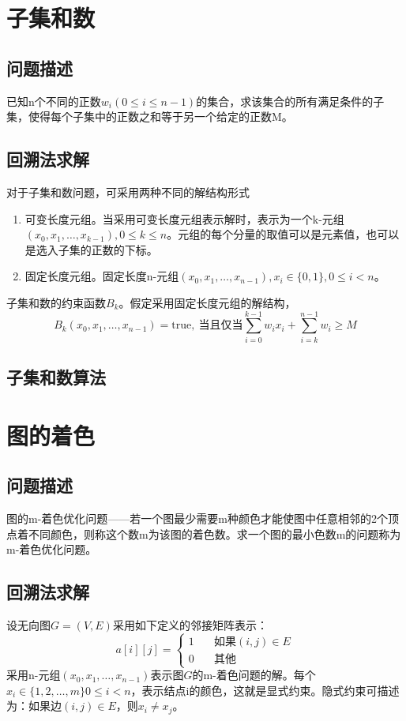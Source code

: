 \section{子集和数}
\subsection*{问题描述}
已知n个不同的正数$w_i(0\leq i\leq n-1)$的集合，求该集合的所有满足条件的子集，使得每个子集中的正数之和等于另一个给定的正数M。
\subsection*{回溯法求解}
对于子集和数问题，可采用两种不同的解结构形式
\begin{enumerate}
	\item 可变长度元组。当采用可变长度元组表示解时，表示为一个k-元组$(x_0,x_1,\dots,x_{k-1}),0\leq k\leq n$。元组的每个分量的取值可以是元素值，也可以是选入子集的正数的下标。
	\item 固定长度元组。固定长度n-元组$(x_0,x_1,\dots,x_{n-1}),x_i\in \{0,1\},0\leq i<n$。
\end{enumerate}

子集和数的约束函数$B_k$。假定采用固定长度元组的解结构，
\begin{equation}
	B_k(x_0,x_1,\dots,x_{n-1})=\mathrm{true},\  \text{当且仅当}\sum_{i=0}^{k-1}w_ix_i+\sum_{i=k}^{n-1}w_i\geq M
\end{equation}
\subsection*{子集和数算法}
\section{图的着色}
\subsection*{问题描述}
图的m-着色优化问题——若一个图最少需要m种颜色才能使图中任意相邻的2个顶点着不同颜色，则称这个数m为该图的着色数。求一个图的最小色数m的问题称为m-着色优化问题。
\subsection*{回溯法求解}
设无向图$G=(V,E)$采用如下定义的邻接矩阵表示：
\begin{equation}
	a[i][j]=\begin{cases}
	 1\quad &\text{如果}(i,j)\in E\\
	 0\quad &\text{其他}
	\end{cases}
\end{equation}
采用n-元组$(x_0,x_1,\dots,x_{n-1})$表示图$G$的m-着色问题的解。每个$x_i\in \{1,2,\dots,m\}0\leq i<n$，表示结点i的颜色，这就是显式约束。隐式约束可描述为：如果边$(i,j)\in E$，则$x_i\ne x_j$。
